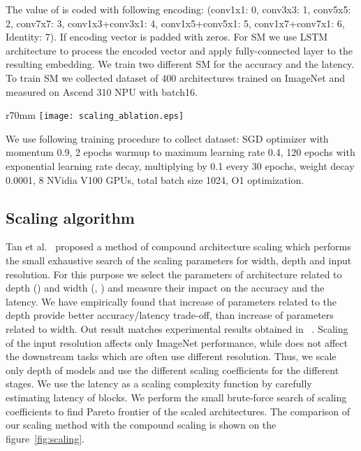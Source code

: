 \documentclass[letterpaper]{article}
\begin{document}
The value of  is coded with following encoding: (conv1x1: 0, conv3x3: 1, conv5x5: 2, conv7x7: 3, conv1x3+conv3x1: 4, conv1x5+conv5x1: 5, conv1x7+conv7x1: 6, Identity: 7). If  encoding vector is padded with zeros. For SM we use LSTM architecture to process the encoded vector and apply fully-connected layer to the resulting embedding. We train two different SM for the accuracy and the latency. To train SM we collected dataset of 400 architectures trained on ImageNet and measured on Ascend 310 NPU with batch16.

\begin{wrapfigure}[22]{r}{70mm}
\texttt{[image: scaling\_ablation.eps]}
\caption{Accuracy/latency trade-off for our ISyNet scaling vs compound scaling. ISyNet scaling shows better results than the compound scaling due to heterogeneous stages scaling and targeting to the NPU latency.}
\label{fig:scaling}
\end{wrapfigure}

We use following training procedure to collect dataset: SGD optimizer with momentum 0.9, 2 epochs warmup to maximum learning rate 0.4, 120 epochs with exponential learning rate decay, multiplying by 0.1 every 30 epochs, weight decay 0.0001, 8 NVidia V100 GPUs, total batch size 1024, O1 optimization.

\subsection{Scaling algorithm}

Tan et al.~\cite{tan2020efficientnet} proposed a method of compound architecture scaling which performs the small exhaustive search of the scaling parameters for width, depth and input resolution. For this purpose we select the parameters of architecture related to depth () and width (, ) and measure their impact on the accuracy and the latency. We have empirically found that increase of parameters related to the depth provide better accuracy/latency trade-off, than increase of parameters related to width. Out result matches experimental results obtained in ~\cite{FastModelsFamilies}.
Scaling of the input resolution affects only ImageNet performance, while does not affect the downstream tasks which are often use different resolution.
Thus, we scale only depth of models and use the different scaling coefficients for the different stages.
We use the latency as a scaling complexity function by carefully estimating latency of blocks.
We perform the small brute-force search of scaling coefficients to find Pareto frontier of the scaled architectures.
The comparison of our scaling method with the compound scaling is shown on the figure~\ref{fig:scaling}.
\end{document}
